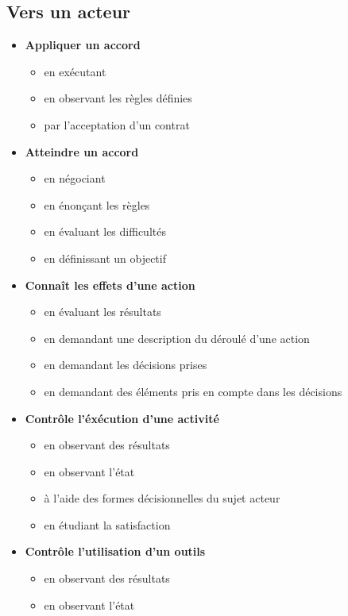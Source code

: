 \documentclass[8pt,a4paper]{article}
\begin{document}
\subsection{Vers un acteur}
\begin{itemize}
\item \textbf{Appliquer un accord}
\begin{itemize}
\item en exécutant
\item en observant les règles définies
\item par l'acceptation d'un contrat
\\ 
 \end{itemize}
\item \textbf{Atteindre un accord}
\begin{itemize}
\item en négociant
\item en énonçant les règles
\item en évaluant les difficultés
\item en définissant un objectif
\\ 
 \end{itemize}
\item \textbf{Connaît les effets d'une action}
\begin{itemize}
\item en évaluant les résultats
\item en demandant une description du déroulé d'une action
\item en demandant les décisions prises
\item en demandant des éléments pris en compte dans les décisions
\\ 
 \end{itemize}
\item \textbf{Contrôle l'éxécution d'une activité}
\begin{itemize}
\item en observant des résultats
\item en observant l'état
\item à l'aide des formes décisionnelles du sujet acteur
\item en étudiant la satisfaction
\\ 
 \end{itemize}
\item \textbf{Contrôle l'utilisation d'un outils}
\begin{itemize}
\item en observant des résultats
\item en observant l'état

\end{itemize}
\end{itemize}
\end{document}
